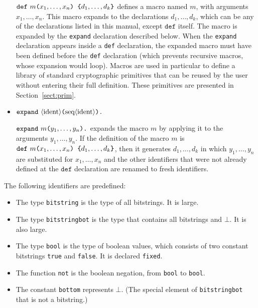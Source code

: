 \begin{itemize}
${\tt def\ }m\texttt{(}x_1, \ldots, x_n\texttt{) \{}
d_1, \ldots, d_k\texttt{\}}$ defines a macro named $m$, with arguments
$x_1, \ldots, x_n$. This macro expands to the declarations
$d_1, \ldots, d_k$, which can be any of the declarations listed in
this manual, except $\texttt{def}$ itself.
The macro is expanded by the \texttt{expand} declaration described below.
When the \texttt{expand} declaration appears inside a \texttt{def}
declaration, the expanded macro must have been defined before the
\texttt{def} declaration (which prevents recursive macros, whose
expansion would loop).
Macros are used in particular to define a library of standard
cryptographic primitives that can be reused by the user without
entering their full definition. These primitives are presented
in Section~\ref{sect:prim}.

\item ${\tt expand\ }\nonterm{ident}\texttt{(}\seq{ident}\texttt{).}$

${\tt expand\ }m\texttt{(}y_1, \ldots, y_n\texttt{).}$ expands the macro
$m$ by applying it to the arguments $y_1, \ldots, y_n$. If the definition
of the macro $m$ is ${\tt def\ }m\texttt{(}x_1, \ldots, x_n\texttt{) \{}
d_1, \ldots, d_k\texttt{\}}$, then it generates $d_1, \ldots, d_k$ in which
$y_1, \ldots, y_n$ are substituted for $x_1, \ldots, x_n$ and the other
identifiers that were not already defined at the $\texttt{def}$ declaration
are renamed to fresh identifiers.

\end{itemize}

The following identifiers are predefined:
\begin{itemize}

\item The type {\tt bitstring} is the type of all bitstrings.
It is large.

\item The type {\tt bitstringbot} is the type that contains
all bitstrings and $\bot$. It is also large.

\item The type {\tt bool} is the type of boolean values, which consists
of two constant bitstrings {\tt true} and {\tt false}.
It is declared {\tt fixed}.

\item The function {\tt not} is the boolean negation, from
{\tt bool} to {\tt bool}.

\item The constant {\tt bottom} represents $\bot$. (The special
element of {\tt bitstringbot} that is not a bitstring.)

\end{itemize}

